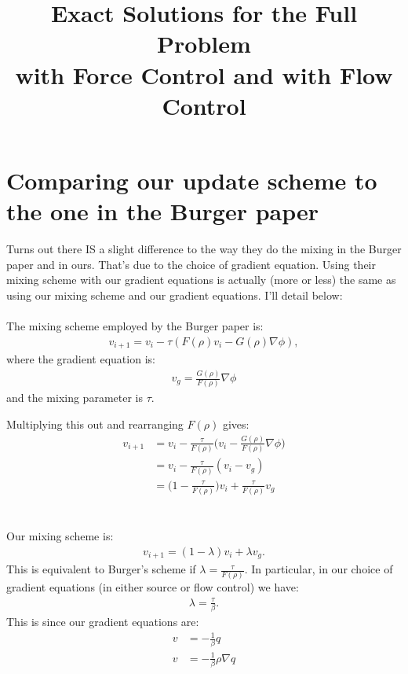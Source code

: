 \documentclass[11pt, a4paper]{article}
\title{Exact Solutions for the Full Problem \\with Force Control and with Flow Control}
\date{}
\theoremstyle{definition}
\begin{document}
\section*{Comparing our update scheme to the one in the Burger paper}
Turns out there IS a slight difference to the way they do the mixing in the Burger paper and in ours. That's due to the choice of gradient equation. Using their mixing scheme with our gradient equations is actually (more or less) the same as using our mixing scheme and our gradient equations. I'll detail below:
\\
\\
The mixing scheme employed by the Burger paper is:
\begin{align*}
v_{i+1} = v_{i} - \tau(F(\rho) v_{i} - G(\rho) \nabla \phi),
\end{align*}
where the gradient equation is:
\begin{align*}
v_g = \frac{G(\rho)}{F(\rho)} \nabla \phi
\end{align*}
and the mixing parameter is $\tau$.

Multiplying this out and rearranging $F(\rho)$ gives:
\begin{align*}
v_{i+1} &=  v_{i} - \frac{\tau}{F(\rho)}\bigg(v_{i} - \frac{G(\rho)}{F(\rho)} \nabla \phi\bigg)\\
&=  v_{i} - \frac{\tau}{F(\rho)}(v_{i} - v_g)\\
&= \bigg(1 - \frac{\tau}{F(\rho)} \bigg) v_{i} + \frac{\tau}{F(\rho)}v_g
\end{align*}
\\
\\
Our mixing scheme is:
\begin{align*}
v_{i+1} = (1-\lambda) v_{i} + \lambda v_g.
\end{align*}
This is equivalent to Burger's scheme if $\lambda =  \frac{\tau}{F(\rho)}$. 
In particular, in our choice of gradient equations (in either source or flow control) we have:
\begin{align*}
\lambda = \frac{\tau}{\beta}.
\end{align*}
This is since our gradient equations are:
\begin{align*}
v &= - \frac{1}{\beta} q\\
v &= - \frac{1}{\beta} \rho \nabla q
\end{align*}
\end{document}
